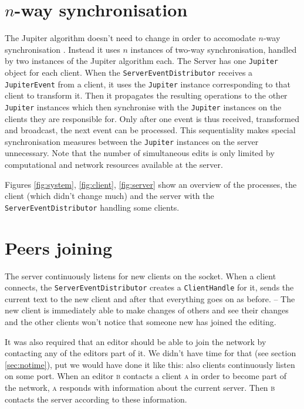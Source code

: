 \documentclass[a4paper,final,12pt,oneside,article,table]{memoir}
\newcommand{\mil}[1]{\texttt{#1}}
\begin{document}
\chapter{$n$-way synchronisation}




The Jupiter algorithm doesn't need to change in order to accomodate
$n$-way synchronisation \cite{Jupiter}. Instead it uses $n$ instances of
two-way synchronisation, handled by two instances of the Jupiter
algorithm each. The Server has one \mil{Jupiter} object for each client.
When the \mil{ServerEventDistributor} receives a \mil{JupiterEvent} from
a client, it uses the \mil{Jupiter} instance corresponding to that
client to transform it. Then it propagates the resulting operations to
the other \mil{Jupiter} instances which then synchronise with the
\mil{Jupiter} instances on the clients they are responsible for. Only
after one event is thus received, transformed and broadcast, the next
event can be processed. This sequentiality makes special synchronisation
measures between the \mil{Jupiter} instances on the server unnecessary.
Note that the number of simultaneous edits is only limited by
computational and network resources available at the server.

Figures \ref{fig:system}, \ref{fig:client}, \ref{fig:server} show an overview of
the processes, the client (which didn't change much) and the server with
the \mil{ServerEventDistributor} handling some clients.


\chapter{Peers joining}
\label{sec:joining}

The server continuously listens for new clients on the socket. When a
client connects, the \mil{ServerEventDistributor} creates a
\mil{ClientHandle} for it, sends the current text to the new client
and after that everything goes on as before. – The new client is
immediately able to make changes of others and see their changes and
the other clients won't notice that someone new has joined the
editing.

It was also required that an editor should be able to join the network
by contacting any of the editors part of it. We didn't have time for
that (see section \ref{sec:notime}), put we would have done it like
this: also clients continuously listen on some port. When an editor
\textsc{b} contacts a client \textsc{a} in order to become part of the
network, \textsc{a} responds with information about the current server.
Then \textsc{b} contacts the server according to these information.
\end{document}
